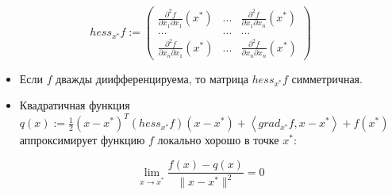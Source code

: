 \begin{equation*}
hess_{x^{*}}f:=\begin{pmatrix}
 {\frac{\partial^{2} f}{\partial x_1 \partial x_1}(x^{*})}& ...& {\frac{\partial^{2} f}{\partial x_1 \partial x_n}(x^{*})}\\
 ...& ...& ...\\
{\frac{\partial^{2} f}{\partial x_n \partial x_1}(x^{*})}& ...& {\frac{\partial^{2} f}{\partial x_n \partial x_n}(x^{*})}
\end{pmatrix}
\end{equation*}
\begin{itemize}
\item Если $f$ дважды диифференцируема, то матрица $hess_{x^{*}}f$ симметричная.
\item Квадратичная функция $q(x):=\frac{1}{2}(x-x^{*})^{T} \left( hess_{x^{*}} f\right)(x-x^{*})+\left\langle  grad_{x^{*}}f, x- x^{*} \right\rangle +f(x^{*})$ аппроксимирует функцию $f$ локально хорошо в точке $x^{*}$:
\end{itemize}
\begin{equation*}
\lim_{x\rightarrow x^{*}} \frac{f(x)-q(x)}{\|x-x^{*}\|^{2}}=0
\end{equation*}\vspace{0.3 cm}
